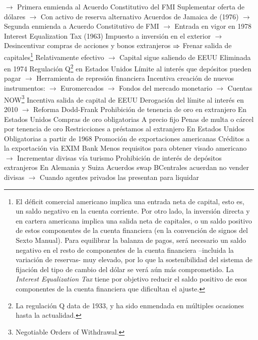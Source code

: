 \documentclass{nuevotema}
\begin{document}
\begin{esquemal}
				\4[] $\to$ Primera enmienda al Acuerdo Constitutivo del FMI
				\4[] Suplementar oferta de dólares
				\4[] $\to$ Con activo de reserva alternativo
				\4[] Acuerdos de Jamaica de (1976)
				\4[] $\to$ Segunda enmienda a Acuerdo Constitutivo de FMI
				\4[] $\to$ Entrada en vigor en 1978
				\4 Interest Equalization Tax (1963)
				\4[] Impuesto a inversión en el exterior
				\4[] $\to$ Desincentivar compras de acciones y bonos extranjeros
				\4[] $\Rightarrow$ Frenar salida de capitales\footnote{El déficit comercial americano implica una entrada neta de capital, esto es, un saldo negativo en la cuenta corriente. Por otro lado, la inversión directa y en cartera americana implica una salida neta de capitales, o un saldo positivo de estos componentes de la cuenta financiera (en la convención de signos del Sexto Manual). Para equilibrar la balanza de pagos, será necesario un saldo negativo en el resto de componentes de la cuenta financiera --incluida la variación de reservas- muy elevado, por lo que la sostenibilidad del sistema de fijación del tipo de cambio del dólar se verá aún más comprometido. La \textit{Interest Equalization Tax} tiene por objetivo reducir el saldo positivo de esos componentes de la cuenta financiera que dificultan el ajuste. }
				\4[] Relativamente efectivo
				\4[] $\to$ Capital sigue saliendo de EEUU
				\4[] Eliminada en 1974
				\4 Regulación Q\footnote{La regulación Q data de 1933, y ha sido enmendada en múltiples ocasiones hasta la actualidad. } en Estados Unidos
				\4[] Límite al interés que depósitos pueden pagar
				\4[] $\to$ Herramienta de represión financiera
				\4[] Incentiva creación de nuevos instrumentos:
				\4[] $\to$ Euromercados
				\4[] $\to$ Fondos del mercado monetario
				\4[] $\to$ Cuentas NOW\footnote{Negotiable Orders of Withdrawal.}
				\4[] Incentiva salida de capital de EEUU
				\4[] Derogación del límite al interés en 2010
				\4[] $\to$ Reforma Dodd-Frank
				\4 Prohibición de tenencia de oro en extranjero
				\4[] En Estados Unidos
				\4 Compras de oro obligatorias
				\4[] A precio fijo
				\4[] Penas de multa o cárcel por tenencia de oro
				\4 Restricciones a préstamos al extranjero
				\4[] En Estados Unidos
				\4[] Obligatorias a partir de 1968
				\4 Promoción de exportaciones americanas
				\4[] Créditos a la exportación via EXIM Bank
				\4[] Menos requisitos para obtener visado americano
				\4[] $\to$ Incrementar divisas vía turismo
				\4 Prohibición de interés de depósitos extranjeros
				\4[] En Alemania y Suiza
				\4 Acuerdos swap
				\4[] BCentrales acuerdan no vender divisas
				\4[] $\to$ Cuando agentes privados las presentan para liquidar

\end{esquemal}
\end{document}
